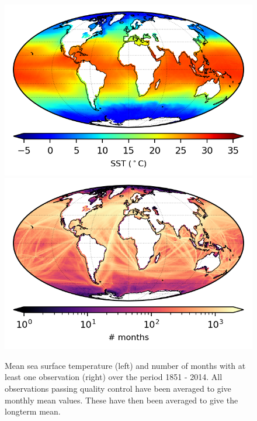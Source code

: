 \begin{figure}[h]
    \includegraphics{resources/observations-sst-mean-map-optimal.png}
    \includegraphics{resources/observations-sst-months-map-optimal.png}
    \caption{Mean sea surface temperature (left) and number of months with at least one observation (right) over the period 1851 - 2014. All observations passing quality control have been averaged to give monthly mean values. These have then been averaged to give the longterm mean.}
    \label{fig:sst-map}
\end{figure}

\FloatBarrier
